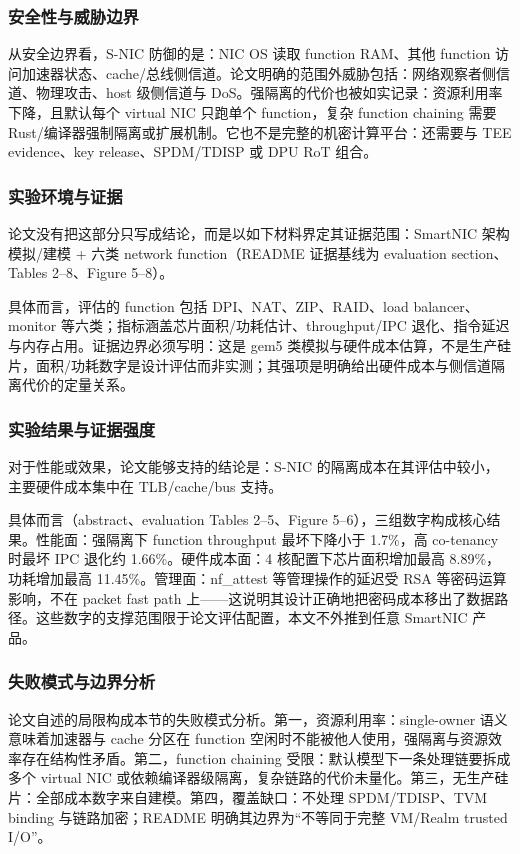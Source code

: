 \documentclass[11pt]{ctexart}
\begin{document}
\subsubsection{安全性与威胁边界}
从安全边界看，S-NIC 防御的是：NIC OS 读取 function RAM、其他 function 访问加速器状态、cache/总线侧信道。论文明确的范围外威胁包括：网络观察者侧信道、物理攻击、host 级侧信道与 DoS。强隔离的代价也被如实记录：资源利用率下降，且默认每个 virtual NIC 只跑单个 function，复杂 function chaining 需要 Rust/编译器强制隔离或扩展机制。它也不是完整的机密计算平台：还需要与 TEE evidence、key release、SPDM/TDISP 或 DPU RoT 组合。\par
\subsubsection{实验环境与证据}
论文没有把这部分只写成结论，而是以如下材料界定其证据范围：SmartNIC 架构模拟/建模 + 六类 network function（README 证据基线为 evaluation section、Tables 2--8、Figure 5--8）。\par
具体而言，评估的 function 包括 DPI、NAT、ZIP、RAID、load balancer、monitor 等六类；指标涵盖芯片面积/功耗估计、throughput/IPC 退化、指令延迟与内存占用。证据边界必须写明：这是 gem5 类模拟与硬件成本估算，不是生产硅片，面积/功耗数字是设计评估而非实测；其强项是明确给出硬件成本与侧信道隔离代价的定量关系。\par
\subsubsection{实验结果与证据强度}
对于性能或效果，论文能够支持的结论是：S-NIC 的隔离成本在其评估中较小，主要硬件成本集中在 TLB/cache/bus 支持。\par
具体而言（abstract、evaluation Tables 2--5、Figure 5--6），三组数字构成核心结果。性能面：强隔离下 function throughput 最坏下降小于 1.7\%，高 co-tenancy 时最坏 IPC 退化约 1.66\%。硬件成本面：4 核配置下芯片面积增加最高 8.89\%，功耗增加最高 11.45\%。管理面：nf\_attest 等管理操作的延迟受 RSA 等密码运算影响，不在 packet fast path 上——这说明其设计正确地把密码成本移出了数据路径。这些数字的支撑范围限于论文评估配置，本文不外推到任意 SmartNIC 产品。\par
\subsubsection{失败模式与边界分析}
论文自述的局限构成本节的失败模式分析。第一，资源利用率：single-owner 语义意味着加速器与 cache 分区在 function 空闲时不能被他人使用，强隔离与资源效率存在结构性矛盾。第二，function chaining 受限：默认模型下一条处理链要拆成多个 virtual NIC 或依赖编译器级隔离，复杂链路的代价未量化。第三，无生产硅片：全部成本数字来自建模。第四，覆盖缺口：不处理 SPDM/TDISP、TVM binding 与链路加密；README 明确其边界为“不等同于完整 VM/Realm trusted I/O”。\par
\end{document}
